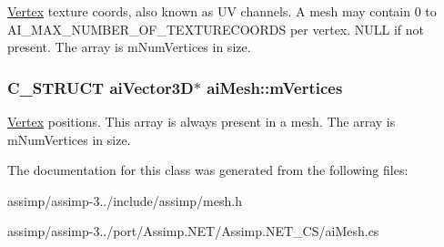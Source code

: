 \hyperlink{struct_vertex}{Vertex} texture coords, also known as U\+V channels. A mesh may contain 0 to A\+I\+\_\+\+M\+A\+X\+\_\+\+N\+U\+M\+B\+E\+R\+\_\+\+O\+F\+\_\+\+T\+E\+X\+T\+U\+R\+E\+C\+O\+O\+R\+D\+S per vertex. N\+U\+L\+L if not present. The array is m\+Num\+Vertices in size. \hypertarget{structai_mesh_afd4588abb3e1c72821ae0234a3850662}{
\subsubsection[{m\+Vertices}]{\setlength{\rightskip}{0pt plus 5cm}C\+\_\+\+S\+T\+R\+U\+C\+T {\bf ai\+Vector3\+D}$\ast$ ai\+Mesh\+::m\+Vertices}}\label{structai_mesh_afd4588abb3e1c72821ae0234a3850662}
\hyperlink{struct_vertex}{Vertex} positions. This array is always present in a mesh. The array is m\+Num\+Vertices in size. 

The documentation for this class was generated from the following files\+:\begin{DoxyCompactItemize}
\item 
assimp/assimp-\/3../include/assimp/mesh.\+h\item 
assimp/assimp-\/3../port/\+Assimp.\+N\+E\+T/\+Assimp.\+N\+E\+T\+\_\+\+C\+S/ai\+Mesh.\+cs\end{DoxyCompactItemize}

